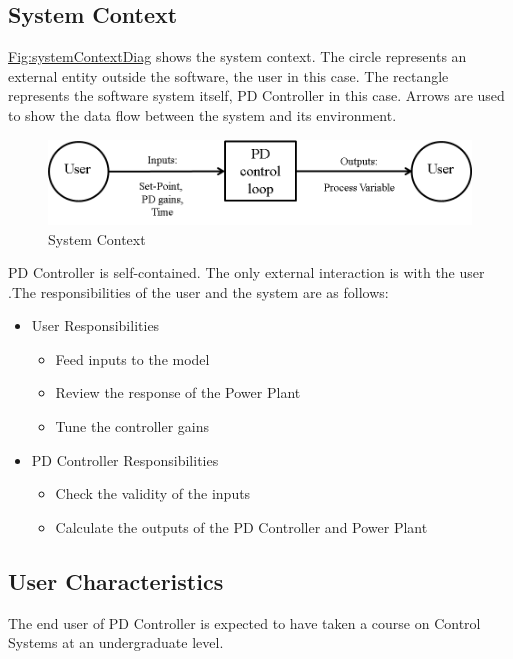 \documentclass[12pt]{article}
\begin{document}
\subsection{System Context}
\label{Sec:SysContext}
\hyperref[Figure:systemContextDiag]{Fig:systemContextDiag} shows the system context. The circle represents an external entity outside the software, the user in this case. The rectangle represents the software system itself, PD Controller in this case. Arrows are used to show the data flow between the system and its environment.

\begin{figure}
\begin{center}
\includegraphics[width=\textwidth]{../../../datafiles/PIDController/Fig_SystemContext.png}
\caption{System Context}
\label{Figure:systemContextDiag}
\end{center}
\end{figure}
PD Controller  is self-contained. The only external interaction is   with the  user .The responsibilities of the  user  and the  system  are as follows:

\begin{itemize}
\item{User Responsibilities}
\begin{itemize}
\item{Feed inputs to the model}
\item{Review the response of the  Power Plant}
\item{Tune the controller gains}
\end{itemize}
\item{PD Controller Responsibilities}
\begin{itemize}
\item{Check the validity of the inputs}
\item{Calculate the outputs of the  PD Controller  and  Power Plant}
\end{itemize}
\end{itemize}
\subsection{User Characteristics}
\label{Sec:UserChars}
The end user of  PD Controller  is expected to have taken a course on Control Systems at an  undergraduate level.
\end{document}
